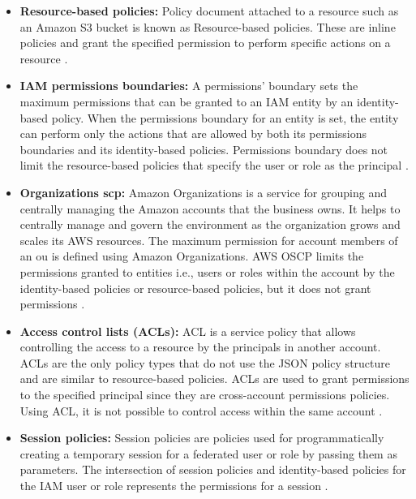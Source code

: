 \begin{itemize}
    \item \textbf{Resource-based policies:} Policy document attached to a resource such as an Amazon S3 bucket is known as Resource-based policies.
    These are inline policies and grant the specified permission to perform specific actions on a resource \cite{27}.
\end{itemize}
\begin{itemize}
    \item \textbf{IAM permissions boundaries:} A permissions' boundary sets the maximum permissions that can be granted to an IAM entity by an identity-based policy.
     When the permissions boundary for an entity is set, the entity can perform only the actions that are allowed by both its permissions boundaries and its identity-based policies.
     Permissions boundary does not limit the
    resource-based policies that specify the user or role as the principal \cite{27}.
\end{itemize}
\begin{itemize}
    \item \textbf{Organizations \gls{scp}:} Amazon
    Organizations
    is a service for grouping and centrally managing the Amazon accounts that the business owns.
    It helps to centrally manage and govern the environment as the organization grows and scales its AWS resources.
    The maximum permission for account members of an
    \gls{ou} is defined using
    Amazon
    Organizations.
    AWS OSCP limits the permissions granted to entities i.e., users or roles within the account by the
    identity-based policies or resource-based policies,
    but it does not grant permissions \cite{27}.

\end{itemize}
\begin{itemize}
    \item \textbf{Access control lists (ACLs):} ACL is a
    service policy that allows controlling the access to a
    resource by the principals in another account.
    ACLs are the only policy types that do not use the JSON policy structure and are similar to resource-based policies.
    ACLs are used to grant permissions to the specified principal since they are cross-account permissions policies.
    Using ACL, it is not possible to control access
    within the same account \cite{27}.
\end{itemize}
\begin{itemize}
    \item \textbf{Session policies:} Session policies are
    policies used for programmatically creating a
    temporary session for a federated user or role by passing them as parameters.
    The intersection of session policies and identity-based policies for the IAM user or role represents the permissions for a session \cite{27}.
\end{itemize}

